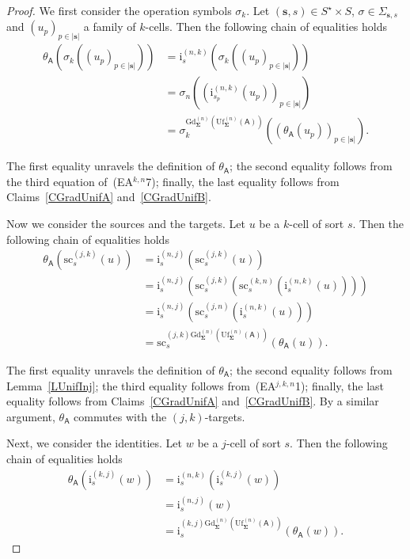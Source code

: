 \documentclass[a4paper, reqno
]{amsart}
\newcommand{\bb}[1]{\ensuremath{\lvert #1 \rvert}}
\newcommand{\sig}[1]{\mathbf{#1}}             %
\newcommand{\calg}[1]{\boldsymbol{\mathsf{#1}}} %
\newcommand{\src}{\mathrm{sc}}
\newcommand{\Gd}{\mathrm{Gd}}
\newcommand{\Uf}{\mathrm{Uf}}
\theoremstyle{plain}
\theoremstyle{definition}
\begin{document}
\begin{proof}
We first consider the operation symbols $\sigma_{k}$.
Let $(\mathbf{s},s)\in S^{\star}\times S$, $\sigma\in\Sigma_{\mathbf{s},s}$ and $(u_{p})_{p\in\bb{\mathbf{s}}}$ a family of $k$-cells.
Then the following chain of equalities holds
\begin{align*}
\theta_{\calg{A}}\left(\sigma_{k}\left((u_{p})_{p\in\bb{\mathbf{s}}}\right)\right)
&=
\mathrm{i}^{(n,k)}_{s}\left(\sigma_{k}\left((u_{p})_{p\in\bb{\mathbf{s}}}\right)\right)
\tag{1}
\\&=
\sigma_{n}\left(\left(\mathrm{i}^{(n,k)}_{s_{p}}(u_{p})\right)_{p\in\bb{\mathbf{s}}}\right)
\tag{2}
\\&=
\sigma_{k}^{\Gd^{(n)}_{\sig{\Sigma}}(\Uf^{(n)}_{\sig{\Sigma}}(\calg{A}))}\left(\left(\theta_{\calg{A}}(u_{p})\right)_{p\in\bb{\mathbf{s}}}\right).
\tag{3}
\end{align*}

The first equality unravels the definition of $\theta_{\calg{A}}$; the second equality follows from the third equation of~(EA$^{k,n}$7); finally, the last equality follows from Claims~\ref{CGradUnifA} and~\ref{CGradUnifB}.

Now we consider the sources and the targets.
Let $u$ be a $k$-cell of sort $s$.
Then the following chain of equalities holds
\begin{align*}
\theta_{\calg{A}}\left(\src^{(j,k)}_{s}(u)\right)
&=
\mathrm{i}^{(n,j)}_{s}\left(\src^{(j,k)}_{s}(u)\right)
\tag{1}
\\&=
\mathrm{i}^{(n,j)}_{s}\left(\src^{(j,k)}_{s}\left(\src^{(k,n)}_{s}\left(\mathrm{i}^{(n,k)}_{s}(u)\right)\right)\right)
\tag{2}
\\&=
\mathrm{i}^{(n,j)}_{s}\left(\src^{(j,n)}_{s}\left(\mathrm{i}^{(n,k)}_{s}(u)\right)\right)
\tag{3}
\\&=
\src^{(j,k)\Gd^{(n)}_{\sig{\Sigma}}(\Uf^{(n)}_{\sig{\Sigma}}(\calg{A}))}_{s}\left(\theta_{\calg{A}}(u)\right).
\tag{4}
\end{align*}

The first equality unravels the definition of $\theta_{\calg{A}}$; the second equality follows from Lemma~\ref{LUnifInj}; the third equality follows from~(EA$^{j,k,n}$1); finally, the last equality follows from Claims~\ref{CGradUnifA} and~\ref{CGradUnifB}.
By a similar argument, $\theta_{\calg{A}}$ commutes with the $(j,k)$-targets.

Next, we consider the identities.
Let $w$ be a $j$-cell of sort $s$.
Then the following chain of equalities holds
\begin{align*}
\theta_{\calg{A}}\left(\mathrm{i}^{(k,j)}_{s}(w)\right)
&=
\mathrm{i}^{(n,k)}_{s}\left(\mathrm{i}^{(k,j)}_{s}(w)\right)
\tag{1}
\\&=
\mathrm{i}^{(n,j)}_{s}(w)
\tag{2}
\\&=
\mathrm{i}^{(k,j)\Gd^{(n)}_{\sig{\Sigma}}(\Uf^{(n)}_{\sig{\Sigma}}(\calg{A}))}_{s}\left(\theta_{\calg{A}}(w)\right).
\tag{3}
\end{align*}


\end{proof}
\end{document}
